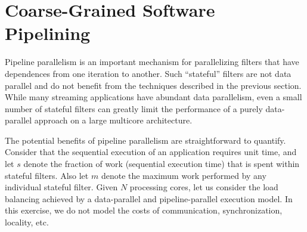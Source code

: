 \begin{figure}[t]
\end{figure}

\section{Coarse-Grained Software Pipelining}

Pipeline parallelism is an important mechanism for parallelizing
filters that have dependences from one iteration to another.  Such
``stateful'' filters are not data parallel and do not benefit from the
techniques described in the previous section.  While many streaming
applications have abundant data parallelism, even a small number of
stateful filters can greatly limit the performance of a purely
data-parallel approach on a large multicore architecture.

The potential benefits of pipeline parallelism are straightforward to
quantify.  Consider that the sequential execution of an application
requires unit time, and let $s$ denote the fraction of work
(sequential execution time) that is spent within stateful filters.
Also let $m$ denote the maximum work performed by any individual
stateful filter.  Given $N$ processing cores, let us consider the load
balancing achieved by a data-parallel and pipeline-parallel execution
model.  In this exercise, we do not model the costs of communication,
synchronization, locality, etc.

